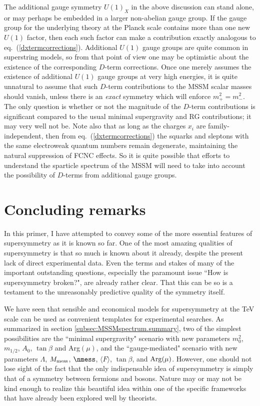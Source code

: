 The additional gauge symmetry $U(1)_X$ in the above discussion
can stand alone, or may perhaps be embedded in a larger non-abelian
gauge group. If the gauge group for the underlying theory at the Planck
scale contains more than one new $U(1)$ factor, then each such
factor can make a contribution exactly analogous to
eq.~(\ref{dxtermcorrections}). Additional $U(1)$ gauge groups are
quite common in superstring models, so from that point of view
one may be optimistic about the existence of the corresponding $D$-term
corrections. Once one merely assumes the existence
of additional $U(1)$ gauge groups at very high energies, it is quite
unnatural to assume that such $D$-term contributions to the MSSM scalar
masses should vanish, unless there is an {\it exact} symmetry which will
enforce $m_+^2 = m_-^2$. The only question is
whether or not the magnitude of the $D$-term contributions is significant
compared to the usual minimal supergravity and RG contributions;
it may very well not be.
Note also that as long as the charges $x_i$ are family-independent,
then from eq.~(\ref{dxtermcorrections}) the squarks and sleptons with the
same electroweak quantum numbers remain degenerate, maintaining the
natural suppression of FCNC effects. So it is quite possible that
efforts to understand the sparticle spectrum of the MSSM will
need to take into account the possibility of $D$-terms from
additional gauge groups.

\section{Concluding remarks}\label{sec:outlook}
\setcounter{equation}{0}
\setcounter{footnote}{1}

In this primer, I have attempted to convey some of the more essential
features of supersymmetry as it is known so far. One of the most amazing
qualities of supersymmetry is that so much is known about it already,
despite the present lack of direct experimental data. Even the terms and
stakes of many of the important outstanding questions, especially the
paramount issue ``How is supersymmetry broken?", are already rather clear.
That this can be so is a testament to the unreasonably predictive quality
of the symmetry itself.

We have seen that sensible and economical models for supersymmetry at
the
TeV scale can be used as convenient templates for experimental searches.
As summarized in section \ref{subsec:MSSMspectrum.summary}, two of the
simplest possibilities are the ``minimal supergravity" scenario with new
parameters $m^2_0$, $m_{1/2}$, $A_0$, $\tan\beta$ and Arg$(\mu )$, and the
``gauge-mediated" scenario with new parameters $\Lambda$, $M_{\rm mess}$,
$\nmess$, $\langle F \rangle$, $\tan\beta$, and ${\rm Arg}(\mu )$.
However, one should not lose sight of the fact that the only indispensable
idea of supersymmetry is simply that of a symmetry between fermions and
bosons. Nature may or may not be kind enough to realize this beautiful
idea within one of the specific frameworks that have already been
explored well by theorists.


